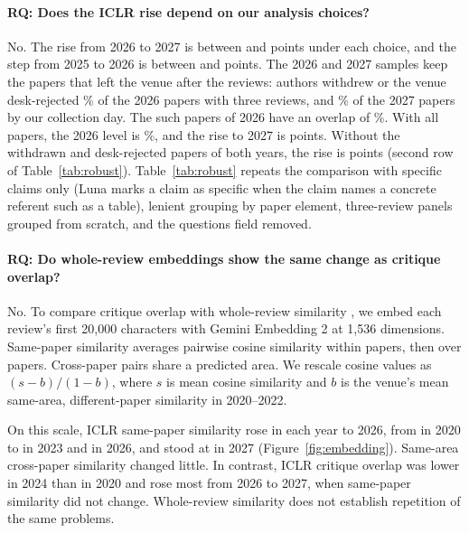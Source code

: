 \documentclass[11pt]{article}
\newcounter{rq}
\newcommand{\question}[2]{\refstepcounter{rq}\paragraph{RQ\therq: #2}\label{#1}}
\begin{document}
\question{app:rise}{Does the ICLR rise depend on our analysis choices?}
No. The rise from 2026 to 2027 is between \RobustSnapMin{} and \RobustSnapMax{} points under each choice, and the step from 2025 to 2026 is between \RobustMin{} and \RobustMax{} points. The 2026 and 2027 samples keep the papers that left the venue after the reviews: authors withdrew or the venue desk-rejected \WithdrawnShare\% of the 2026 papers with three reviews, and \WithdrawnEarlyShare\% of the 2027 papers by our collection day. The \WithdrawnPapers{} such papers of 2026 have an overlap of \WithdrawnLevel\%. With all papers, the 2026 level is \IclrSnapBase\%, and the rise to 2027 is \IclrSnapChange{} points. Without the withdrawn and desk-rejected papers of both years, the rise is \IclrKeptChange{} points (second row of Table~\ref{tab:robust}). Table~\ref{tab:robust} repeats the comparison with specific claims only (Luna marks a claim as specific when the claim names a concrete referent such as a table), lenient grouping by paper element, three-review panels grouped from scratch, and the questions field removed.

\begin{table}[!htp]
\centering\small

\caption{The ICLR rise holds under each analysis choice. The top rows compare 2026 with 2027, both with reviews during the discussion phase. The bottom rows compare 2025, with final reviews, with 2026. Papers: papers with a value in that year. The last two checks use samples of papers, so their SEs are larger. SE in parentheses. Luna and a council member give the same specificity flag to \RefSpecific\% of the claims that both extract. Both extract a claim when at least half of the words of Luna's quote lie inside the member's quote.}
\label{tab:robust}
\end{table}


\question{app:embedding}{Do whole-review embeddings show the same change as critique overlap?}
No. To compare critique overlap with whole-review similarity \citep{liang2024monitoring,baumann2026stop}, we embed each review's first 20,000 characters with Gemini Embedding 2 at 1,536 dimensions. Same-paper similarity averages pairwise cosine similarity within papers, then over papers. Cross-paper pairs share a predicted area. We rescale cosine values as $(s-b)/(1-b)$, where $s$ is mean cosine similarity and $b$ is the venue's mean same-area, different-paper similarity in 2020--2022.

On this scale, ICLR same-paper similarity rose in each year to 2026, from \EmbedScaledSameBase{} in 2020 to \EmbedScaledSameMid{} in 2023 and \EmbedScaledSamePrev{} in 2026, and stood at \EmbedScaledSameLast{} in 2027 (Figure~\ref{fig:embedding}). Same-area cross-paper similarity changed little. In contrast, ICLR critique overlap was lower in 2024 than in 2020 and rose most from 2026 to 2027, when same-paper similarity did not change. Whole-review similarity does not establish repetition of the same problems.
\end{document}
